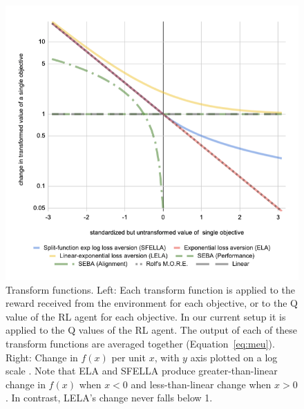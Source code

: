 \begin{figure}[h]
  \includegraphics[width=\columnwidth]{output/transform_graph_2d_integral_with_rolf2.png}%
  \caption{Transform functions. Left: Each transform function is applied to the reward received from the environment for each objective, or to the Q value of the RL agent for each objective. In our current setup it is applied to the Q values of the RL agent.
  The output of each of these transform functions are averaged together %
  (Equation~\ref{eq:meu}). Right: Change in $f(x)$ per unit $x$, with $y$ axis plotted on a log scale%
  . Note that ELA and SFELLA produce greater-than-linear change in $f(x)$ when $x<0$ and less-than-linear change when $x>0$. In contrast, LELA's change never falls below 1.}
  \label{fig:transform_functions}
\end{figure}

